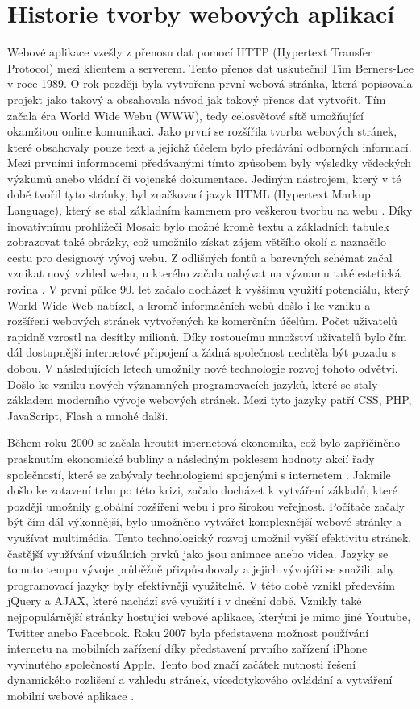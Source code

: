     \section{Historie tvorby webových aplikací}
Webové aplikace vzešly z přenosu dat pomocí HTTP (Hypertext Transfer Protocol) mezi klientem a serverem. Tento přenos dat uskutečnil Tim Berners-Lee v roce 1989. O rok později byla vytvořena první webová stránka, která popisovala projekt jako takový a obsahovala návod jak takový přenos dat vytvořit. Tím začala éra World Wide Webu (WWW), tedy celosvětové sítě umožňující okamžitou online komunikaci. Jako první se rozšířila tvorba webových stránek, které obsahovaly pouze text a jejichž účelem bylo předávání odborných informací. Mezi prvními informacemi předávanými tímto způsobem byly výsledky vědeckých výzkumů anebo vládní či vojenské dokumentace. Jediným nástrojem, který v té době tvořil tyto stránky, byl značkovací jazyk HTML (Hypertext Markup Language), který se stal základním kamenem pro veškerou tvorbu na webu \cite{futureofsoftware}. Díky inovativnímu prohlížeči Mosaic bylo možné kromě textu a základních tabulek zobrazovat také obrázky, což umožnilo získat zájem většího okolí a naznačilo cestu pro designový vývoj webu. Z odlišných fontů a barevných schémat začal vznikat nový vzhled webu, u kterého začala nabývat na významu také estetická rovina \cite{webbrowsers}. V první půlce 90. let začalo docházet k vyššímu využití potenciálu, který World Wide Web nabízel, a kromě informačních webů došlo i ke vzniku a rozšíření webových stránek vytvořených ke komerčním účelům. Počet uživatelů rapidně vzrostl na desítky milionů. Díky rostoucímu množství uživatelů bylo čím dál dostupnější internetové připojení a žádná společnost nechtěla být pozadu s dobou. V následujících letech umožnily nové technologie rozvoj tohoto odvětví. Došlo ke vzniku nových významných programovacích jazyků, které se staly základem moderního vývoje webových stránek. Mezi tyto jazyky patří CSS, PHP, JavaScript, Flash a mnohé další.

Během roku 2000 se začala hroutit internetová ekonomika, což bylo zapříčiněno prasknutím ekonomické bubliny a následným poklesem hodnoty akcií řady společností, které se zabývaly technologiemi spojenými s internetem \cite{bubble}. Jakmile došlo ke zotavení trhu po této krizi, začalo docházet k vytváření základů, které později umožnily globální rozšíření webu i pro širokou veřejnost. Počítače začaly být čím dál výkonnější, bylo umožněno vytvářet komplexnější webové stránky a využívat multimédia. Tento technologický rozvoj umožnil vyšší efektivitu stránek, častější využívání vizuálních prvků jako jsou animace anebo videa. Jazyky se tomuto tempu vývoje průběžně přizpůsobovaly a jejich vývojáři se snažili, aby programovací jazyky byly efektivněji využitelné. V této době vznikl především jQuery a AJAX, které nachází své využití i v dnešní době. Vznikly také nejpopulárnější stránky hostující webové aplikace, kterými je mimo jiné Youtube, Twitter anebo Facebook. Roku 2007 byla představena možnost používání internetu na mobilních zařízení díky představení prvního zařízení iPhone vyvinutého společností Apple. Tento bod značí začátek nutnosti řešení dynamického rozlišení a vzhledu stránek, vícedotykového ovládání a vytváření mobilní webové aplikace \cite{futureofsoftware}.

